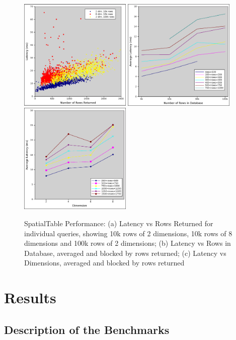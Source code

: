 \documentclass[11pt]{article}
\begin{document}
\begin{figure}[t]
\includegraphics[width=2.1in]{stres}
\includegraphics[width=2.1in]{nrowseff}
\includegraphics[width=2.1in]{dimeff}
\caption{SpatialTable Performance: (a) Latency vs Rows Returned for individual queries, showing 10k rows of 2 dimensions, 10k rows of 8 dimensions and 100k rows of 2 dimensions; (b) Latency vs Rows in Database, averaged and blocked by rows returned; (c) Latency vs Dimensions, averaged and blocked by rows returned }
\label{fig:res}
\end{figure}

\section{Results}

\subsection{Description of the Benchmarks}
\end{document}
